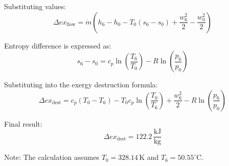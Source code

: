 Substituting values:  
\[
\Delta ex_{\text{flow}} = \dot{m} \left( h_6 - h_0 - T_0 (s_6 - s_0) + \frac{w_6^2}{2} - \frac{w_0^2}{2} \right)  
\]  

Entropy difference is expressed as:  
\[
s_6 - s_0 = c_p \ln \left( \frac{T_6}{T_0} \right) - R \ln \left( \frac{p_6}{p_0} \right)  
\]  

Substituting into the exergy destruction formula:  
\[
\Delta ex_{\text{dest}} = c_p (T_0 - T_6) - T_0 c_p \ln \left( \frac{T_0}{T_6} \right) + \frac{w_6^2}{2} - R \ln \left( \frac{p_6}{p_0} \right)  
\]  

Final result:  
\[
\Delta ex_{\text{dest}} = 122.2 \, \frac{\text{kJ}}{\text{kg}}  
\]  

Note: The calculation assumes \( T_0 = 328.14 \, \text{K} \) and \( T_6 = 50.55^\circ \text{C} \).
